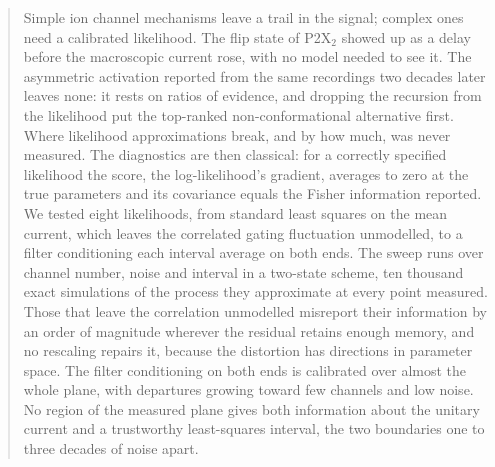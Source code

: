 \begin{abstract}
Simple ion channel mechanisms leave a trail in the signal; complex ones need a calibrated likelihood. The flip state of P2X$_2$ showed up as a delay before the macroscopic current rose, with no model needed to see it. The asymmetric activation reported from the same recordings two decades later leaves none: it rests on ratios of evidence, and dropping the recursion from the likelihood put the top-ranked non-conformational alternative first. Where likelihood approximations break, and by how much, was never measured. The diagnostics are then classical: for a correctly specified likelihood the score, the log-likelihood's gradient, averages to zero at the true parameters and its covariance equals the Fisher information reported. We tested eight likelihoods, from standard least squares on the mean current, which leaves the correlated gating fluctuation unmodelled, to a filter conditioning each interval average on both ends. The sweep runs over channel number, noise and interval in a two-state scheme, ten thousand exact simulations of the process they approximate at every point measured. Those that leave the correlation unmodelled misreport their information by an order of magnitude wherever the residual retains enough memory, and no rescaling repairs it, because the distortion has directions in parameter space. The filter conditioning on both ends is calibrated over almost the whole plane, with departures growing toward few channels and low noise. No region of the measured plane gives both information about the unitary current and a trustworthy least-squares interval, the two boundaries one to three decades of noise apart.
\end{abstract}
